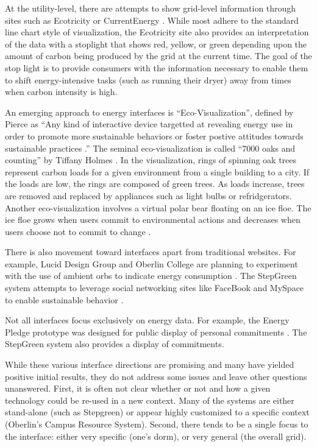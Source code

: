 At the utility-level, there are attempts to show grid-level information
through sites such as Ecotricity \cite{Ecotricity} or CurrentEnergy
\cite{CurrentEnergy}.  While most adhere to the standard line chart style
of visualization, the Ecotricity site also provides an interpretation of
the data with a stoplight that shows red, yellow, or green depending upon
the amount of carbon being produced by the grid at the current time.  The
goal of the stop light is to provide consumers with the information
necessary to enable them to shift energy-intensive tasks (such as running
their dryer) away from times when carbon intensity is high.

An emerging approach to energy interfaces is ``Eco-Visualization'',
defined by Pierce as ``Any kind of interactive device targetted at
revealing energy use in order to promote more sustainable behaviors or
foster postive attitudes towards sustainable practices \cite{Pierce08}.''
The seminal eco-visualization is called ``7000 oaks and counting'' by
Tiffany Holmes \cite{Holmes07}.  In the visualization, rings of spinning
oak trees represent carbon loads for a given environment from a single
building to a city.  If the loads are low, the rings are composed of green
trees. As loads increase, trees are removed and replaced by appliances such
as light bulbs or refridgerators.  Another eco-visualization involves a
virtual polar bear floating on an ice floe. The ice floe grows when users
commit to environmental actions and decreases when users choose not to
commit to change \cite{Dillahunt08}.

There is also movement toward interfaces apart from traditional
websites.  For example, Lucid Design Group and Oberlin College are
planning to experiment with the use of ambient orbs to indicate energy
consumption \cite{Peterson09}.  The StepGreen system attempts to 
leverage social networking sites like FaceBook and MySpace to enable sustainable
behavior \cite{Mankoff07}. 

Not all interfaces focus exclusively on energy data.  For example, the
Energy Pledge prototype was designed for public display of personal
commitments \cite{Pierce09}.  The StepGreen system also provides a display
of commitments.  

While these various interface directions are promising and many have
yielded positive initial results, they do not address some issues and leave
other questions unanswered. First, it is often not clear whether or not and
how a given technology could be re-used in a new context.  Many of the
systems are either stand-alone (such as Stepgreen) or appear highly
customized to a specific context (Oberlin's Campus Resource
System). Second, there tends to be a single focus to the interface: either
very specific (one's dorm), or very general (the overall grid).  

